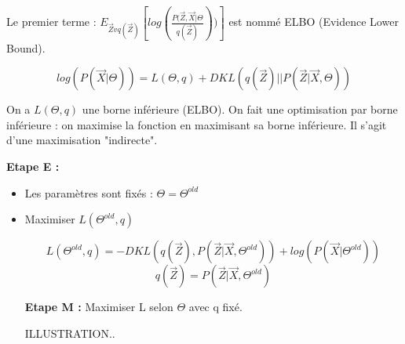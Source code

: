 \documentclass{article}
\begin{document}
Le premier terme : $ E_{\vec{Z} v q(\vec{Z})} [log(\frac{P(\vec{Z}, \vec{X} | \Theta}{q(\vec{Z})}))] $ est nommé ELBO (Evidence Lower Bound).

\[ log(P(\vec{X} | \Theta)) = L(\Theta, q) + DKL(q(\vec{Z}) || P(\vec{Z} | \vec{X}, \Theta))  \]

On a $L(\Theta, q)$ une borne inférieure (ELBO). On fait une optimisation par borne inférieure : on maximise la fonction en maximisant sa borne inférieure. Il s'agit d'une maximisation "indirecte".

\textbf{Etape E :} 
\begin{itemize}
\item Les paramètres sont fixés : $\Theta = \Theta^{old}$
\item Maximiser $L(\Theta^{old}, q)$

\[ L(\Theta^{old}, q) = - DKL(q(\vec{Z}), P(\vec{Z} | \vec{X}, \Theta^{old})) + log (P(\vec{X} | \Theta^{old})) \]
\[ q(\vec{Z}) = P(\vec{Z} | \vec{X}, \Theta^{old})  \]

\textbf{Etape M :} Maximiser L selon $\Theta$ avec q fixé.

ILLUSTRATION..
\end{itemize}
\end{document}
